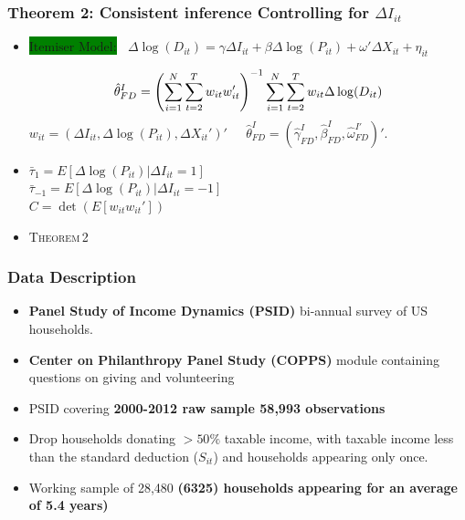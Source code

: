 \documentclass[options]{beamer}
\newcommand{\highlight}[1]{\colorbox{green}{\ensuremath{#1}}}
\begin{document}
\begin{frame}
	\frametitle{Theorem 2: Consistent inference Controlling for $\Delta I_{it}$ }
	\begin{itemize}
\small
\item[] \highlight{\textrm{Itemiser Model:}} $\;\;\Delta \log(D_{it})=\gamma\Delta I_{it}+\beta \Delta\log(P_{it})+ \omega'\Delta X_{it}+ \eta_{it} $

\begin{equation*}\scriptsize
\hat{\theta}_{FD}^{I}=\left(\sum_{i=1}^{N}\sum_{t=2}^{T}w_{it}w_{it}'\right)^{-1}\sum_{i=1}^{N}\sum_{t=2}^{T}w_{it}\Delta\log(D_{it})
\end{equation*}
 $w_{it}=(\Delta I_{it}, \Delta \log (P_{it}), \Delta X_{it}')'$ 
 $\;\;\;\;\hat{\theta}^I_{FD}=(\hat{\gamma}_{FD}^I,\hat{\beta}_{FD}^I,\hat{\omega}_{FD}^{I'})'$.
\vspace{15pt}
\item[]  $\bar{\tau}_{1}=E[\Delta\log(P_{it})|\Delta I_{it}=1]$\\ \vspace{2pt}
 $\bar{\tau}_{-1}=E[\Delta \log(P_{it})|\Delta I_{it}=-1]$\\  \vspace{2pt}
$C=\det(E[w_{it}w_{it}'])$ 
\vspace{10pt}
\item[] \textsc{Theorem\,2\,\,}

\end{itemize}
\end{frame}
\begin{frame}
	\frametitle{Data Description}
	\begin{itemize}
\item[]\textbf{Panel Study of Income Dynamics (PSID)}  bi-annual survey of US
households.
\vspace{9pt}
\item[]\textbf{Center on Philanthropy
Panel Study (COPPS)} module containing questions on giving and volunteering
\vspace{9pt}
\item[] PSID covering \textbf{2000-2012  raw sample 58,993
observations}
\vspace{9pt}
\item[] Drop households donating $>50\%$  taxable income,  with taxable income less than the standard deduction ($S_{it}$) 
and households appearing only once. 
\vspace{9pt}
\item[]  Working sample of 28,480 \textbf{ (6325) households appearing for an average of 5.4 years) }
\end{itemize}\end{frame}
\end{document}
